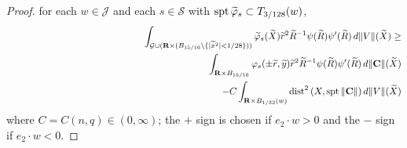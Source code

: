 \documentclass[a4paper,11pt]{amsart}
\begin{document}
\begin{proof}
for each $w \in {\mathcal J}$ and each $s \in {\mathcal S}$ with 
${\rm spt} \, \widetilde{\varphi}_{s} \subset T_{3/128}(w)$,
\begin{eqnarray}\label{L2-est-S8-1}
&&\hspace{-.2in}\int_{\mathcal G \cup ({\mathbf R} \times (B_{15/16} \setminus \{|\widetilde{x}^{2}| < 1/28\}))}\widetilde{\varphi}_{s}(\widetilde{X})\widetilde{r}^{2}\widetilde{R}^{-1}\psi(\widetilde{R})\psi^{\prime}(\widetilde{R}) \, d\|V\|(\widetilde{X}) \geq \nonumber\\
&&\hspace{1.5in}\int_{{\mathbf R} \times B_{15/16}}\varphi_{s}(\pm\widetilde{r},\widetilde{y})\widetilde{r}^{2}\widetilde{R}^{-1}\psi(\widetilde{R})\psi^{\prime}(\widetilde{R}) \, d\|{\mathbf C}\|(\widetilde{X})\nonumber\\
&&\hspace{3in} - C\int_{{\mathbf R} \times B_{1/32}(w)}{\rm dist}^{2} \, (X, {\rm spt}\,\|{\mathbf C}\|) \, d\|V\|(\widetilde{X})
\end{eqnarray}
where $C = C(n, q) \in (0, \infty)$; the $+$ sign is chosen if $e_{2}\cdot w> 0$ and the $-$ sign if $e_{2}\cdot w < 0.$ 


\end{proof}
\end{document}
